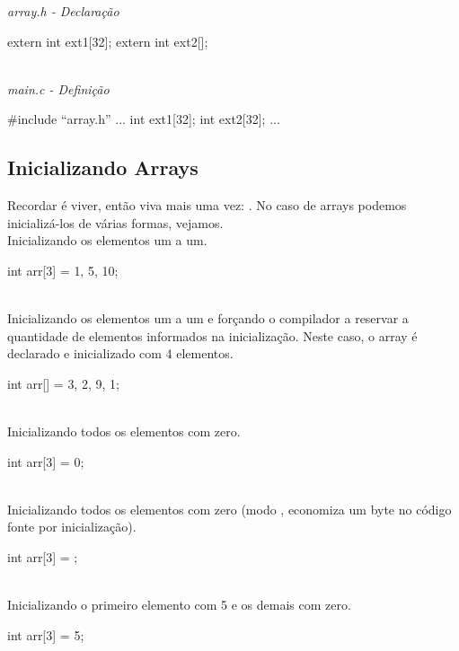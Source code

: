 \textit{array.h - Declaração}\\
\begin{ccode}
extern int ext1[32];
extern int ext2[];
\end{ccode}
\\

\textit{main.c - Definição}\\
\begin{ccode}
#include ``array.h''
...
int ext1[32];
int ext2[32];
...
\end{ccode}


\subsection{Inicializando Arrays}
Recordar é viver, então viva mais uma vez: . No caso de arrays podemos inicializá-los de várias formas, vejamos.
\\

Inicializando os elementos um a um.

\begin{ccode}
  int arr[3] = {1, 5, 10};
\end{ccode}
\\

Inicializando os elementos um a um e forçando o compilador a reservar a quantidade de elementos informados na inicialização. Neste caso, o array é declarado e inicializado com 4 elementos.

\begin{ccode}
  int arr[] = {3, 2, 9, 1};
\end{ccode}
\\

Inicializando todos os elementos com zero.

\begin{ccode}
  int arr[3] = {0};
\end{ccode}
\\

Inicializando todos os elementos com zero (modo , economiza um byte no código fonte por inicialização).

\begin{ccode}
  int arr[3] = {};
\end{ccode}
\\

Inicializando o primeiro elemento com 5 e os demais com zero.

\begin{ccode}
  int arr[3] = {5};
\end{ccode}
\\

